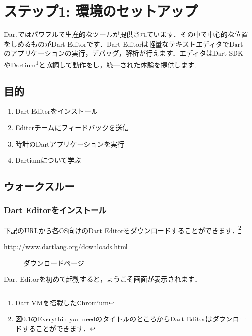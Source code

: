 \chapter*{ステップ1: 環境のセットアップ}
\addtocounter{chapter}{1}

Dartではパワフルで生産的なツールが提供されています．その中で中心的な位置をしめるものがDart Editorです．Dart Editorは軽量なテキストエディタでDartのアプリケーションの実行，デバッグ，解析が行えます．エディタはDart SDKやDartium\footnote{Dart VMを搭載したChromium}と協調して動作をし，統一された体験を提供します．

\section{目的}

\begin{enumerate}
\item Dart Editorをインストール
\item Editorチームにフィードバックを送信
\item 時計のDartアプリケーションを実行
\item Dartiumについて学ぶ
\end{enumerate}

\section{ウォークスルー}

\subsection{Dart Editorをインストール}

下記のURLから各OS向けのDart Editorをダウンロードすることができます．\footnote{図\ref{fig:download_page}のEverythin you needのタイトルのところからDart Editorはダウンロードすることができます．}

\vspace{5mm}
\url{http://www.dartlang.org/downloads.html}
\vspace{5mm}

\begin{figure}
\caption{ダウンロードページ\label{fig:download_page}}
\end{figure}

Dart Editorを初めて起動すると，ようこそ画面が表示されます．


